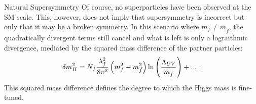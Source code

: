 \begin{section}{Natural Supersymmetry}
Of course, no superparticles have been observed at the SM scale.
This, however, does not imply that supersymmetry is incorrect but only that it may be a broken symmetry.
In this scenario where $m_f \neq m_{\tilde{f}}$, the quadratically divergent terms still cancel and what is left is only a lograithmic divergence, mediated by the squared mass difference of the partner particles:
\begin{align}
\delta m_{H}^2 = N_f\frac{\lambda_f^2}{8\pi^2} \left(m_f^2 - m_{\tilde{f}}^2\right) \ln\left(\frac{\Lambda_{UV}}{m_{\tilde{f}}}\right) + ...\ .
\label{eqn:total_higgs_correction}
\end{align}
This squared mass difference defines the degree to which the Higgs mass is fine-tuned.

\end{section}

